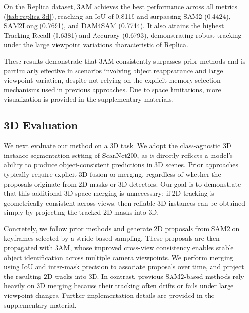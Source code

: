 On the Replica dataset, 3AM achieves the best performance across all metrics (\cref{tab:replica-3d}), reaching an IoU of 0.8119 and surpassing SAM2 (0.4424), SAM2Long (0.7691), and DAM4SAM (0.7744). It also attains the highest Tracking Recall (0.6381) and Accuracy (0.6793), demonstrating robust tracking under the large viewpoint variations characteristic of Replica.

These results demonstrate that 3AM consistently surpasses prior methods and is particularly effective in scenarios involving object reappearance and large viewpoint variation, despite not relying on the explicit memory-selection mechanisms used in previous approaches. Due to space limitations, more visualization is provided in the supplementary materials.


\vspace{-0.5em}
\subsection{3D Evaluation}
\vspace{-0.5em}

We next evaluate our method on a 3D task.  
We adopt the class-agnostic 3D instance segmentation setting of ScanNet200, as it directly reflects a model’s ability to produce object-consistent predictions in 3D scenes.  
Prior approaches typically require explicit 3D fusion\cite{xu2024esam} or merging\cite{yang2023sam3d}, regardless of whether the proposals originate from 2D masks\cite{jung2025details} or 3D detectors\cite{boudjoghra2025openyolo, nguyen2024open3dis}.
Our goal is to demonstrate that this additional 3D-space merging is unnecessary: if 2D tracking is geometrically consistent across views, then reliable 3D instances can be obtained simply by projecting the tracked 2D masks into 3D.

Concretely, we follow prior methods\cite{zhao2025sam2object} and generate 2D proposals from SAM2 on keyframes selected by a stride-based sampling.  
These proposals are then propagated with 3AM, whose improved cross-view consistency enables stable object identification across multiple camera viewpoints.  
We perform merging using IoU and inter-mask precision to associate proposals over time, and project the resulting 2D tracks into 3D.  
In contrast, previous SAM2-based methods\cite{zhao2025sam2object} rely heavily on 3D merging because their tracking often drifts or fails under large viewpoint changes.  
Further implementation details are provided in the supplementary material.

